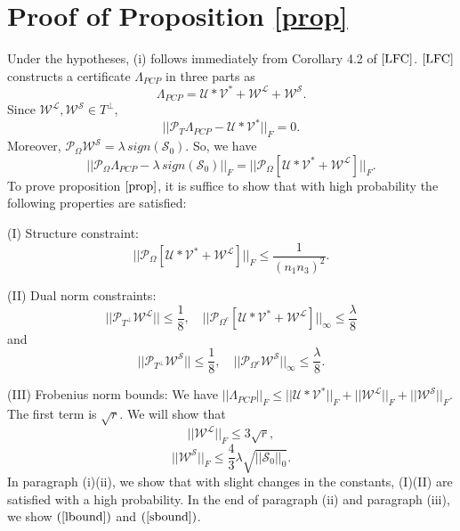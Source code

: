 \documentclass[journal,transmag]{IEEEtran}
\theoremstyle{plain}
\begin{document}
\section{Proof of Proposition \ref{prop}}


Under the hypotheses, (i) follows immediately from Corollary 4.2 of $\cite{LFC}$. $\cite{LFC}$ constructs a certificate $\Lambda_{PCP}$ in three parts as
\[\Lambda_{PCP} = \mathcal{U} \ast \mathcal{V}^* + \mathcal{W}^{\mathcal{L}} + \mathcal{W}^{\mathcal{S}}.\]
Since $\mathcal{W}^{\mathcal{L}}, \mathcal{W}^{\mathcal{S}} \in T^{\bot}$, \[ ||\mathcal{P}_T \Lambda_{PCP} -  \mathcal{U} \ast \mathcal{V}^*||_F = 0.\]
Moreover, $\mathcal{P}_{\Omega}\mathcal{W}^{\mathcal{S}}=\lambda  \,sign(\mathcal{S}_0)$. So, we have
\[||\mathcal{P}_{\Omega}\Lambda_{PCP} - \lambda \, sign(\mathcal{S}_0)||_F=||\mathcal{P}_{\Omega} [\mathcal{U} \ast \mathcal{V}^* + \mathcal{W}^{\mathcal{L}}]||_F.\]
To prove proposition $\ref{prop}$, it is suffice to show that with high probability the following properties are satisfied:

(I) Structure constraint:
\begin{equation} \label{struc}
{ ||\mathcal{P}_{\Omega} [\mathcal{U} \ast \mathcal{V}^* + \mathcal{W}^{\mathcal{L}}]||_F \le \frac{1}{(n_1 n_3)^2}.}
\end{equation}

(II) Dual norm constraints:
\begin{equation} \label{dual1}
{||\mathcal{P}_{T^{\bot}} \mathcal{W}^{\mathcal{L}}|| \le \frac{1}{8}, \quad ||\mathcal{P}_{\Omega^c}[\mathcal{U} \ast \mathcal{V}^* + \mathcal{W}^{\mathcal{L}}]||_{\infty} \le \frac{\lambda}{8} }
\end{equation}
and
\begin{equation}\label{dual2}
{||\mathcal{P}_{T^{\bot}}\mathcal{W}^{\mathcal{S}}|| \le \frac{1}{8}, \quad ||\mathcal{P}_{\Omega^c} \mathcal{W}^{\mathcal{S}}||_{\infty}\le \frac{\lambda}{8}.}
\end{equation}

(III) Frobenius norm bounds: We have $ ||\Lambda_{PCP}||_F \le ||\mathcal{U} \ast \mathcal{V}^*||_F + ||\mathcal{W}^{\mathcal{L}}||_F + ||\mathcal{W}^{\mathcal{S}}||_F. $ The first term is $\sqrt{r}.$ We will show that
\begin{equation} \label{lbound}
{|| \mathcal{W}^{\mathcal{L}}||_F \le 3\sqrt{r},}
\end{equation}
\begin{equation} \label{sbound}
{||\mathcal{W}^{\mathcal{S}}||_F \le \frac{4}{3} \lambda \sqrt{||\mathcal{S}_0||_0}.}
\end{equation}
In paragraph (i)(ii), we show that with slight changes in the constants, (I)(II) are satisfied with a high probability. In the end of paragraph (ii) and paragraph (iii), we show $(\ref{lbound})$ and $(\ref{sbound})$.
\end{document}
